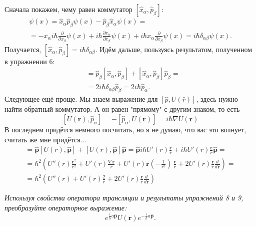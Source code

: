 Сначала покажем, чему равен коммутатор $[\hat{x}_{\alpha}, \hat{p}_{\beta}]$:
\begin{gather*}
    [\hat{x}_{\alpha}, \hat{p}_{\beta}] \psi(x) = \hat{x}_{\alpha} \hat{p}_{\beta} \psi(x) - \hat{p}_{\beta} \hat{x}_{\alpha} \psi(x) = \\
    = -x_{\alpha} i \hbar \frac{\partial}{\partial x_{\beta}} \psi(x) + i \hbar \frac{\partial x_{\alpha}}{\partial x_{\beta}} \psi(x) + i \hbar x_{\alpha} \frac{\partial}{\partial x_{\beta}} \psi(x) = i \hbar \delta_{\alpha \beta}\psi(x).
\end{gather*}
Получается, $[\hat{x}_{\alpha}, \hat{p}_{\beta}] = i \hbar \delta_{\alpha \beta}$. Идём дальше, пользуясь результатом, полученном в упражнении 6:
\begin{align*}
[\hat x_{\alpha}, \hat{\mathbf{p}}^2] &= \hat{p}_{\beta} [\hat{x}_{\alpha}, \hat{p}_{\beta}] + [\hat{x}_{\alpha}, \hat{p}_{\beta}] \hat{p}_{\beta} = \\ &= 2 i \hbar \delta_{\alpha \beta} \hat{p}_{\beta} = 2 i \hbar \hat{p}_{\alpha}.
\end{align*}
Следующее ещё проще. Мы знаем выражение для $[\hat p, U(\hat r)]$, здесь нужно найти обратный коммутатор. А он равен "прямому" с другим знаком, то есть
\[
[U(\mathbf{r}), \hat{p}_{\alpha}] = - [\hat{p}_\alpha, U(\mathbf{r})] = i \hbar \nabla U(\mathbf{r})
\]
В последнем придётся немного посчитать, но я не думаю, что вас это волнует, считать же мне придётся...
\begin{gather*}
    [U(r), \hat{\mathbf{p}}^2] = \hat{\mathbf{p}}[U(r), \hat{\mathbf{p}}] + [U(r), \hat{\mathbf{p}}]\hat{\mathbf{p}} = \hat{\mathbf{p}}i\hbar U'(r)\frac{\mathbf{r}}{r} + i\hbar U'(r)\frac{\mathbf{r}}{r}\hat{\mathbf{p}} = \\
    = \hbar^2(U''(r)\frac{\mathbf{r}^2}{r^2} + U'(r) \frac{\nabla\mathbf{r}}{r} + U'(r)\mathbf{r}(-\frac{1}{r^2})\,\frac{\mathbf{r}}{r} + 2U'(r) \frac{\mathbf{r}}{r}\frac{d}{d\mathbf{r}}) = \\
    =\hbar^2(U''(r) + U'(r) \frac{2}{r} + 2U'(r) \frac{\mathbf{r}}{r}\frac{d}{d\mathbf{r}})
\end{gather*}

\begin{center}
\textit{Используя свойства оператора трансляции и результаты упражнений 8 и 9, преобразуйте операторное выражение:}
\[
e^{\frac{i}{\hbar} a \hat{\mathbf{p}}} U(\mathbf{r}) e^{-\frac{i}{\hbar} a \hat{\mathbf{p}}}.
\]
\end{center}

